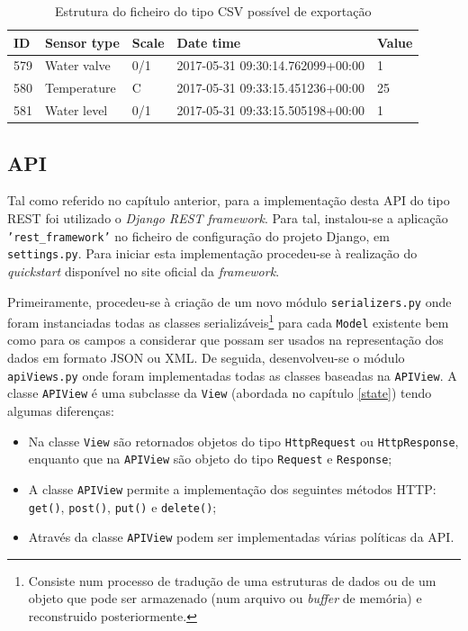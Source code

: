\begin{table}[h]
	\centering

	\begin{tabular}{|l|l|l|l|l|}
		\hline
		ID & Sensor type & Scale & Date time & Value \\ \hline
		579 & Water valve & 0/1 & 2017-05-31 09:30:14.762099+00:00 & 1 \\ \hline
		580 & Temperature & C & 2017-05-31 09:33:15.451236+00:00 & 25 \\ \hline
		581 & Water level & 0/1 & 2017-05-31 09:33:15.505198+00:00 & 1 \\ \hline
	\end{tabular}
	\caption{Estrutura do ficheiro do tipo \acs{CSV} possível de exportação}
	\label{exportcsv}
\end{table}




\subsection{API}


Tal como referido no capítulo anterior, para a implementação desta API do tipo REST foi utilizado o \textit{Django REST framework}. Para tal, instalou-se a aplicação \texttt{'rest\_framework'} no ficheiro de configuração do projeto Django, em \texttt{settings.py}. Para iniciar esta implementação procedeu-se à realização do \textit{quickstart} disponível no site oficial da \textit{framework}\cite{quickstart}. 

Primeiramente, procedeu-se à criação de um novo módulo \texttt{serializers.py} onde foram instanciadas todas as classes serializáveis\footnote{Consiste num processo de tradução de uma estruturas de dados ou de um objeto que pode ser armazenado (num arquivo ou \textit{buffer} de memória) e reconstruido posteriormente.  } para cada \texttt{Model} existente bem como  para os campos a considerar que possam ser usados na representação dos dados em formato \ac{JSON} ou \ac{XML}. De seguida, desenvolveu-se o módulo \texttt{apiViews.py} onde foram implementadas todas as classes baseadas na \texttt{APIView}. A classe \texttt{APIView} é uma subclasse da \texttt{View} (abordada no capítulo \ref{state}) tendo algumas diferenças: 

\begin{itemize}
	\item Na classe \texttt{View} são retornados objetos do tipo \texttt{HttpRequest} ou \texttt{HttpResponse}, enquanto que na \texttt{APIView} são objeto do tipo \texttt{Request} e \texttt{Response}; 
	\item A classe \texttt{APIView} permite a implementação dos seguintes métodos \ac{HTTP}: 	\texttt{get()}, \texttt{post()}, \texttt{put()} e \texttt{delete()}; 
	\item Através da classe  \texttt{APIView} podem ser implementadas várias políticas da \ac{API}. 
\end{itemize}

